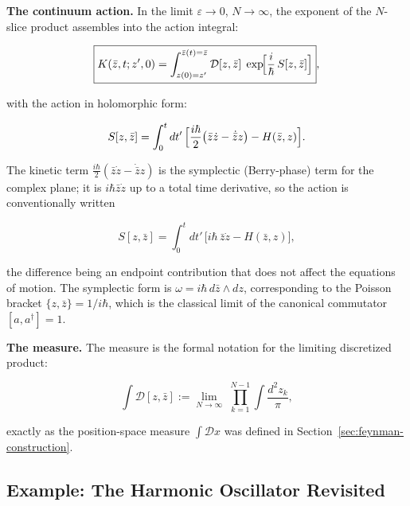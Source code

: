 \medskip\noindent\textbf{The continuum action.} In the limit $\varepsilon \to 0$, $N \to \infty$, the exponent of the $N$-slice product assembles into the action integral:
\begin{linenomath}
\begin{equation}
\boxed{K(\bar z, t; z',0) = \int_{z(0)=z'}^{\bar z(t)=\bar z} \mathcal{D}[z,\bar z]\;
\exp\!\Bigl[\frac{i}{\hbar}\,S[z,\bar z]\Bigr]} ,
\label{eq:coherent-path-integral}
\end{equation}
\end{linenomath}
with the action in holomorphic form:
\begin{linenomath}
\begin{equation}
S[z,\bar z] = \int_{0}^{t} dt'\,\Bigl[\frac{i\hbar}{2}\bigl(\bar z\dot z - \dot{\bar z}z\bigr) - H(\bar z, z)\Bigr].
\label{eq:holomorphic-action}
\end{equation}
\end{linenomath}
The kinetic term $\frac{i\hbar}{2}(\bar z\dot z - \dot{\bar z}z)$ is the symplectic (Berry-phase) term for the complex plane; it is $i\hbar\bar z\dot z$ up to a total time derivative, so the action is conventionally written
\begin{linenomath}
\begin{equation}
S[z,\bar z] = \int_{0}^{t} dt'\,\bigl[i\hbar\,\bar z\dot z - H(\bar z, z)\bigr],
\label{eq:holomorphic-action-standard}
\end{equation}
\end{linenomath}
the difference being an endpoint contribution that does not affect the equations of motion. The symplectic form is $\omega = i\hbar\,d\bar z \wedge dz$, corresponding to the Poisson bracket $\{z, \bar z\} = 1/i\hbar$, which is the classical limit of the canonical commutator $[a, a^{\dagger}] = 1$.

\medskip\noindent\textbf{The measure.} The measure is the formal notation for the limiting discretized product:
\begin{linenomath}
\begin{equation}
\int\mathcal{D}[z,\bar z] := \lim_{N\to\infty}\;\prod_{k=1}^{N-1}\int\frac{d^{2}z_{k}}{\pi},
\label{eq:boson-measure}
\end{equation}
\end{linenomath}
exactly as the position-space measure $\int\mathcal{D}x$ was defined in Section~\ref{sec:feynman-construction}.

\subsection{Example: The Harmonic Oscillator Revisited}


